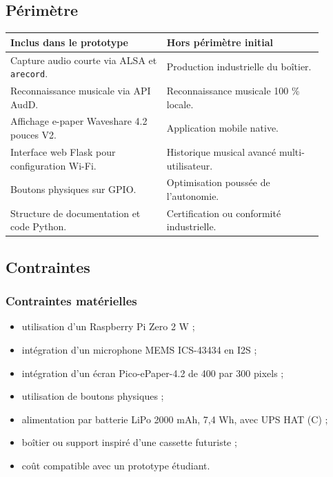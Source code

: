 \subsection{Périmètre}

\begin{longtable}{|p{0.45\linewidth}|p{0.45\linewidth}|}
\hline
\textbf{Inclus dans le prototype} & \textbf{Hors périmètre initial} \\
\hline
Capture audio courte via ALSA et \texttt{arecord}. &
Production industrielle du boîtier. \\
\hline
Reconnaissance musicale via API AudD. &
Reconnaissance musicale 100 \% locale. \\
\hline
Affichage e-paper Waveshare 4.2 pouces V2. &
Application mobile native. \\
\hline
Interface web Flask pour configuration Wi-Fi. &
Historique musical avancé multi-utilisateur. \\
\hline
Boutons physiques sur GPIO. &
Optimisation poussée de l'autonomie. \\
\hline
Structure de documentation et code Python. &
Certification ou conformité industrielle. \\
\hline
\end{longtable}

\subsection{Contraintes}

\subsubsection{Contraintes matérielles}

\begin{itemize}
    \item utilisation d'un Raspberry Pi Zero 2 W ;
    \item intégration d'un microphone MEMS ICS-43434 en I2S ;
    \item intégration d'un écran Pico-ePaper-4.2 de 400 par 300 pixels ;
    \item utilisation de boutons physiques ;
    \item alimentation par batterie LiPo 2000 mAh, 7,4 Wh, avec UPS HAT (C) ;
    \item boîtier ou support inspiré d'une cassette futuriste ;
    \item coût compatible avec un prototype étudiant.
\end{itemize}

